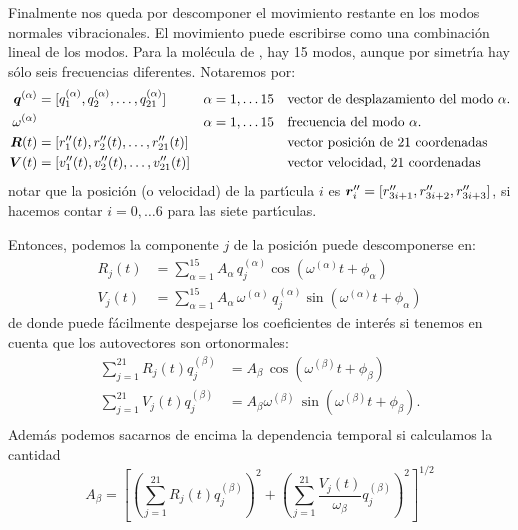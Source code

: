 Finalmente nos queda por descomponer el movimiento restante en los modos normales vibracionales. El movimiento puede escribirse como una combinaci\'{o}n lineal de los modos. Para la mol\'{e}cula de , hay 15 modos, aunque por simetr\'{\i}a hay s\'{o}lo seis frecuencias diferentes. Notaremos por:
\begin{align*}
  \bm{q}^{(\alpha)} &= [q^{(\alpha)}_{1},q^{(\alpha)}_{2}, \dots, q^{(\alpha)}_{21}] &  \alpha = 1,\dots 15 & \quad \text{vector de desplazamiento del modo $\alpha$.}\\
\omega^{(\alpha)} & & \alpha = 1,\dots 15  & \quad \text{frecuencia del modo $\alpha$.}\\
\bm{R}(t) &= [r''_{1}(t), r''_{2}(t), \dots, r''_{21}(t)] &  & \quad \text{vector posici\'{o}n de 21 coordenadas}\\
\bm{V}(t) &= [v''_{1}(t), v''_{2}(t), \dots, v''_{21}(t)] &  & \quad \text{vector velocidad, 21 coordenadas}
\end{align*}
notar que la posici\'{o}n (o velocidad) de la part\'{\i}cula $i$ es $\bm{r}''_{i}= [r''_{3i+1}, r''_{3i+2}, r''_{3i+3}]$, si hacemos contar $i=0,\dots 6$ para las siete part\'{\i}culas.

Entonces, podemos la componente $j$ de la posici\'{o}n puede descomponerse en:
\begin{align*}
  R_{j}(t)&= \sum_{\alpha=1}^{15} A_{\alpha}\, q^{(\alpha)}_{j} \cos{(\omega^{(\alpha)} t + \phi_{\alpha})} \\
  V_{j}(t)&= \sum_{\alpha=1}^{15} A_{\alpha}\, \omega^{(\alpha)} \, q^{(\alpha)}_{j} \sin{(\omega^{(\alpha)} t + \phi_{\alpha})}
\end{align*}
de donde puede f\'{a}cilmente despejarse los coeficientes de inter\'{e}s si tenemos en cuenta que los autovectores son ortonormales:
\begin{align*}
  \sum_{j=1}^{21} R_{j}(t) q^{(\beta)}_{j} &= A_{\beta} \, \cos{(\omega^{(\beta)}t + \phi_{\beta})} \\ 
 \sum_{j=1}^{21} V_{j}(t) q^{(\beta)}_{j} &= A_{\beta} \omega^{(\beta)} \, \sin{(\omega^{(\beta)}t + \phi_{\beta})} .\\
\end{align*}
%
Adem\'{a}s podemos sacarnos de encima la dependencia temporal si calculamos la cantidad
\begin{equation*}
  A_{\beta} =\left[\left( \sum_{j=1}^{21} R_{j}(t) q^{(\beta)}_{j} \right)^{2} + \left( \sum_{j=1}^{21} \frac{V_{j}(t)}{\omega_{\beta}} q^{(\beta)}_{j} \right)^{2}\right]^{1/2}
\end{equation*}

